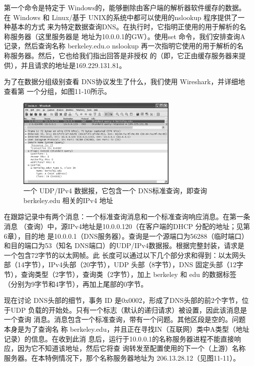第一个命令是特定于 Windows的，能够删除由客户端的解析器软件缓存的数据。在
Windows 和 Linux/基于 UNIX的系统中都可以使用的nslookup 程序提供了一种基本的方式
来为特定数据查询DNS。在执行时，它指明正使用的用于解析的名称服务器（这里服务器是
地址为10.0.0.1的GW）。使用set 命令，我们安排查询A记录，然后查询名称 berkeley.edu.o
nslookup 再一次指明它使用的用于解析的名称服务器。然后，它也给我们指出回答是非授权
的（即，它正由缓存服务器来提供），并且请求的地址是169.229.131.81。

为了在数据分组级别查看 DNS协议发生了什么，我们使用 Wireshark，并详细地查看第
一个分组，如图11-10所示。

\begin{figure}[!htb]
    \centering
	\includegraphics[width=0.7\textwidth]{imgs/11/11-10.png}
	\caption{一个 UDP/IPv4 数据报，它包含一个 DNS标准查询，即查询 berkeley.edu 相关的IPv4 地址}
\end{figure}

在跟踪记录中有两个消息：一个标准查询消息和一个标准查询响应消息。在第一条消息
（查询）中，源IPv4地址是10.0.0.120（在客户端的DHCP 分配的地址；见第6章），目的地
是10.0.0.1（DNS服务器）。查询是一个源端口为56288（临时端口）和目的端口为53（知名
DNS端口）的UDP/IPv4数据报。根据完整封装，请求是一个包含72字节的以太网帧。此
长度可以通过以下几个部分求和得到：以太网头部（14字节），IPv4头部（20字节），UDP
头部（8字节），DNS 固定头部（12字节），查询类型（2字节），查询类（2字节），加上
berkeley 和 edu 的数据标签（分别为9字节和4字节），再加上尾部的0字节。

现在讨论 DNS头部的细节，事务 ID 是0x0002，形成了DNS头部的前2个字节，位
于UDP 负载的开始处。只有一个标志（默认的递归请求）被设置，因此该消息是一个查询
消息。消息包含一个标准查询，带有一个问题。其他区段是空的。问题本身是为了查询名
称 berkeley.edu，并且正在寻找IN（互联网）类中A类型（地址记录）的信息。在收到此消
息后，运行于10.0.0.1的名称服务器进程不能直接响应，因为它不知道该地址，然后它将查
询转发至配置使用的下一个（上游）名称服务器。在本特例情况下，那个名称服务器地址为
206.13.28.12（见图11-11）。

